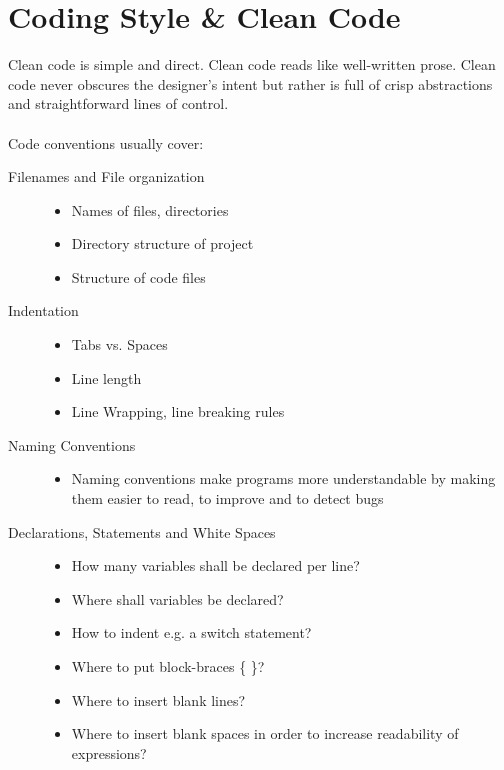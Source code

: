 \documentclass[a4paper,10pt]{article}
\begin{document}
\section{Coding Style \& Clean Code}
Clean code is simple and direct. Clean code reads like well-written prose. Clean code never obscures the designer’s intent but rather is full of crisp abstractions and straightforward lines of control. \\ \\
Code conventions usually cover: 
\begin{description}
	\item[Filenames and  File organization] \hfill 
		\begin{itemize}
			\item Names of files, directories
			\item Directory structure of project
			\item Structure of code files
		\end{itemize}
	\item[Indentation] \hfill
		\begin{itemize}
			\item Tabs vs. Spaces
			\item Line length
			\item Line Wrapping, line breaking rules	
		\end{itemize}
	\item[Naming Conventions] \hfill
		\begin{itemize}
			\item Naming conventions make programs more understandable by making them easier to read, to improve and to detect bugs
		\end{itemize}
	\item[Declarations, Statements and White Spaces] \hfill 
		\begin{itemize}
			\item How many variables shall be declared per line?
			\item Where shall variables be declared?
			\item How to indent e.g. a switch statement?
			\item Where to put block-braces \{ \}?
			\item Where to insert blank lines?
			\item Where to insert blank spaces in order to increase readability of expressions?
		\end{itemize}
\end{description}
\end{document}
